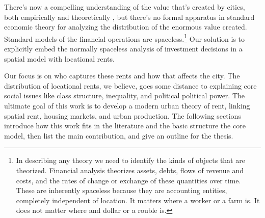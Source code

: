 There's now a compelling understanding of the value that's created by cities, both empirically and theoretically \cite{jacobsEconomyCities1969, spenceUrbanizationGrowth2009, bettencourtIntroductionUrbanScience2021}, but there's no formal apparatus in standard economic theory for analyzing the distribution of the enormous value created. %
Standard models of the financial operations are spaceless.\footnote{In describing any theory we need to identify the kinds of objects that are theorized. Financial analysis theorizes  assets, debts, flows of revenue and costs, and the rates of change or exchange of these quantities over time. These are inherently spaceless because they are accounting entities, completely independent of location. It matters where a worker or a farm is. It does not matter where and dollar or a rouble is.} 
Our solution is to explicitly embed the normally spaceless analysis of investment decisions in a spatial model with locational rents. %

Our focus is on who captures these rents and how that affects the city. The distribution of locational rents, we believe, goes some distance to explaining core social issues like class structure, inequality, and political political power. 
The ultimate goal of this work is to develop a modern urban theory of rent, linking spatial rent, housing markets, and urban production. The following sections introduce how this work fits in the literature and the basic structure the core model, then list the main contribution, and give an outline for the thesis.

